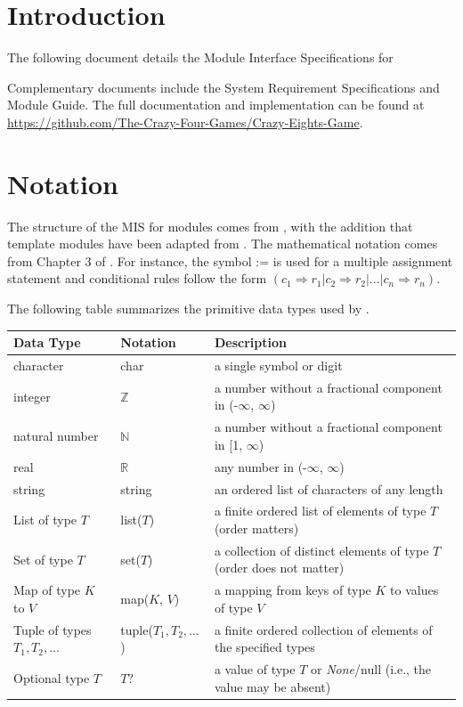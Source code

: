 \documentclass[12pt, titlepage]{article}
\begin{document}
\newpage


\section{Introduction}

The following document details the Module Interface Specifications for
\progname

Complementary documents include the System Requirement Specifications
and Module Guide.  The full documentation and implementation can be
found at \url{https://github.com/The-Crazy-Four-Games/Crazy-Eights-Game}. 

\section{Notation}

The structure of the MIS for modules comes from \citet{HoffmanAndStrooper1995},
with the addition that template modules have been adapted from
\cite{GhezziEtAl2003}.  The mathematical notation comes from Chapter 3 of
\citet{HoffmanAndStrooper1995}.  For instance, the symbol := is used for a
multiple assignment statement and conditional rules follow the form $(c_1
\Rightarrow r_1 | c_2 \Rightarrow r_2 | ... | c_n \Rightarrow r_n )$.

The following table summarizes the primitive data types used by \progname. 

\begin{center}
\renewcommand{\arraystretch}{1.2}
\noindent 
\begin{tabular}{l l p{7.5cm}} 
\toprule 
\textbf{Data Type} & \textbf{Notation} & \textbf{Description}\\ 
\midrule
character & char & a single symbol or digit\\
integer & $\mathbb{Z}$ & a number without a fractional component in (-$\infty$, $\infty$) \\
natural number & $\mathbb{N}$ & a number without a fractional component in [1, $\infty$) \\
real & $\mathbb{R}$ & any number in (-$\infty$, $\infty$)\\
string & string & an ordered list of characters of any length \\
List of type $T$ & list($T$) & a finite ordered list of elements of type $T$ (order matters) \\
Set of type $T$ & set($T$) & a collection of distinct elements of type $T$ (order does not matter) \\
Map of type $K$ to $V$ & map($K$, $V$) & a mapping from keys of type $K$ to values of type $V$ \\
Tuple of types $T_1, T_2, \ldots$ & tuple($T_1, T_2, \ldots$) & a finite ordered collection of elements of the specified types \\
Optional type $T$ & $T?$ & a value of type $T$ or \textit{None}/null (i.e., the value may be absent) \\
\bottomrule
\end{tabular} 
\end{center}
\end{document}
